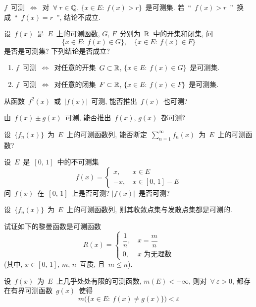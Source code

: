 \newpage
\begin{problemset}

\item $f$~可测~$\Leftrightarrow$~对~$\forall~r \in \mathbb{Q}$, $\{x \in E: \: f(x) > r\}$~是可测集. 若~``~$f(x) > r$~''~换成~``~$f(x) = r$~'', 结论不成立.

\item 设~$f(x)$~是~$E$~上的可测函数, $G,\,F$~分别为~$\mathbb{R}$~中的开集和闭集, 问
    \[
    \{x \in E: \: f(x) \in G\}, \quad \{x \in E: \: f(x) \in F\}
    \]
    是否是可测集? 下列结论是否成立?

\begin{enumerate}
  \item[(1)] $f$~可测~$\Leftrightarrow$~对任意的开集~$G \subset \mathbb{R}$, $\{x \in E: \: f(x) \in G\}$~是可测集.
  \item[(2)] $f$~可测~$\Leftrightarrow$~对任意的闭集~$F \subset \mathbb{R}$, $\{x \in E: \: f(x) \in F\}$~是可测集.
\end{enumerate}

\item 从函数~$f^2(x)$~或~$|f(x)|$~可测, 能否推出~$f(x)$~也可测?

\item 由~$f(x)\pm g(x)$~可测, 能否推出~$f(x),\,g(x)$~都可测?

\item 设~$\{f_n(x)\}$~为~$E$~上的可测函数列, 能否断定~$\sum\limits_{n=1}^\infty f_n(x)$~为~$E$~上的可测函数?

\item 设~$E$~是~$[0,\,1]$~中的不可测集
\[
f(x) = \left\{\!\!
\begin{array}{cl}
x, \, & x \in E \\[0.1cm]
-x, \, & x \in [0,\,1] - E
\end{array}
\right.
\]
问~$f(x)$~在~$[0,\,1]$~上是否可测? $|f(x)|$~是否可测?

\item 设~$\{f_n(x)\}$~为~$E$~上的可测函数列, 则其收敛点集与发散点集都是可测的.

\item 试证如下的黎曼函数是可测函数
\[
R(x) = \left\{\!\!
\begin{array}{cl}
\dfrac{1}{n}, \, &  x = \dfrac{m}{n} \\[0.2cm]
0, \, &  x \mbox{~为无理数}
\end{array}
\right.
\]
(其中, $x \in [0,\,1],\,m,\,n$~互质, 且~$m \leqslant n$).

\item 设~$f(x)$~为~$E$~上几乎处处有限的可测函数, $m(E) < +\infty$, 则对~$\forall~\varepsilon > 0$, 都存在有界可测函数~$g(x)$~使得
\[
m\big( \{x \in E:\: f(x) \neq g(x) \}\big) < \varepsilon
\]


\end{problemset}
